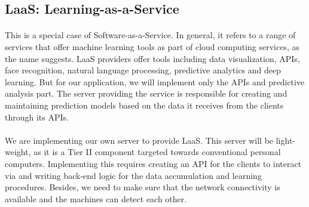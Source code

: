 \begin{comment}
\paragraph{Raspberry Pi}
The Raspberry Pi is an ARM-based Single Board Computer. It was initially launched in the UK to teach programming to school children but being very cheap yet powerful, it became a favorite among computer hobbyists around the world. The latest revision available at the time of writing this report is revision 3. Raspberry Pi runs it's own flavor of Linux based on Debian called Raspbian OS.

\paragraph{SciKit Learn}
SciKit Learn is an open-source machine learning library native to Python that is based on scipy and numpy. SciKit Learn implements a variety of machine learning algorithms in a very efficient way. It also comes with interfaces for many other popular languages.
\end{comment}

\subsection{LaaS: Learning-as-a-Service}
\paragraph{}
This is a special case of Software-as-a-Service. In general, it refers to a range of services that offer machine learning tools as part of cloud computing services, as the name suggests. LaaS providers offer tools including data visualization, APIs, face recognition, natural language processing, predictive analytics and deep learning. But for our application, we will implement only the APIs and predictive analysis part. The server providing the service is responsible for creating and maintaining prediction models based on the data it receives from the clients through its APIs.
\paragraph{}
We are implementing our own server to provide LaaS. This server will be light-weight, as it is a Tier II component targeted towards conventional personal computers. Implementing this requires creating an API for the clients to interact via and writing back-end logic for the data accumulation and learning procedures. Besides, we need to make sure that the network connectivity is available and the machines can detect each other.
